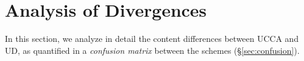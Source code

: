 \documentclass[11pt,a4paper]{article}
\begin{document}




\section{Analysis of Divergences}\label{sec:analysis}

In this section, we analyze in detail the content differences between UCCA and UD,
as quantified in a \textit{confusion matrix} between the schemes (\S\ref{sec:confusion}).
\end{document}
